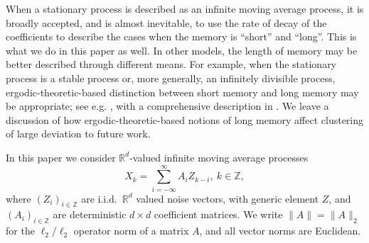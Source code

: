 \documentclass[11pt,reqno]{amsart}
\numberwithin{equation}{section}
\theoremstyle{definition}
\theoremstyle{remark}
\theoremstyle{definition}
\newcommand{\PP}{\mathbb{P}}
\newcommand{\RR}{\mathbb{R}}
\newcommand{\ZZ}{\mathbb{Z}}
\begin{document}
 



When a stationary process is described as an infinite moving average
process, it is broadly accepted, and is almost inevitable, to use the
rate of decay of the coefficients to describe the cases when the
memory is ``short'' and ``long''. This is what we do in this paper as
well. In other models, the length of memory may be better described
through different means. For example, when the stationary process is a
stable process or, more generally, an infinitely divisible process,
ergodic-theoretic-based distinction between short memory and long
memory may be appropriate; see e.g.
\cite{samorodnitsky:2004a,owada:samorodnitsky:2015a,
  chen:samorodnitsky:2022}, with a 
comprehensive description in \cite{samorodnitsky:2016}. We leave a
discussion of how ergodic-theoretic-based notions of long memory
affect clustering of large deviation to future work.

In this paper we consider $\RR^d$-valued infinite moving average processes
\begin{equation}\label{eq:def_moving_avg}
    X_k = \sum_{i=-\infty}^\infty A_i Z_{k-i}, \  k\in\ZZ,
\end{equation}
where $(Z_i)_{i\in\ZZ}$ are i.i.d.\ $\RR^d$ valued noise vectors, with generic element $Z$, and $(A_i)_{i\in\ZZ}$ are deterministic $d\times d$ coefficient matrices. 
We write $\|A\| = \|A\|_2$ for the $\ell_2/\ell_2$ operator norm of a matrix $A$, and all vector norms are Euclidean. 


\end{document}
